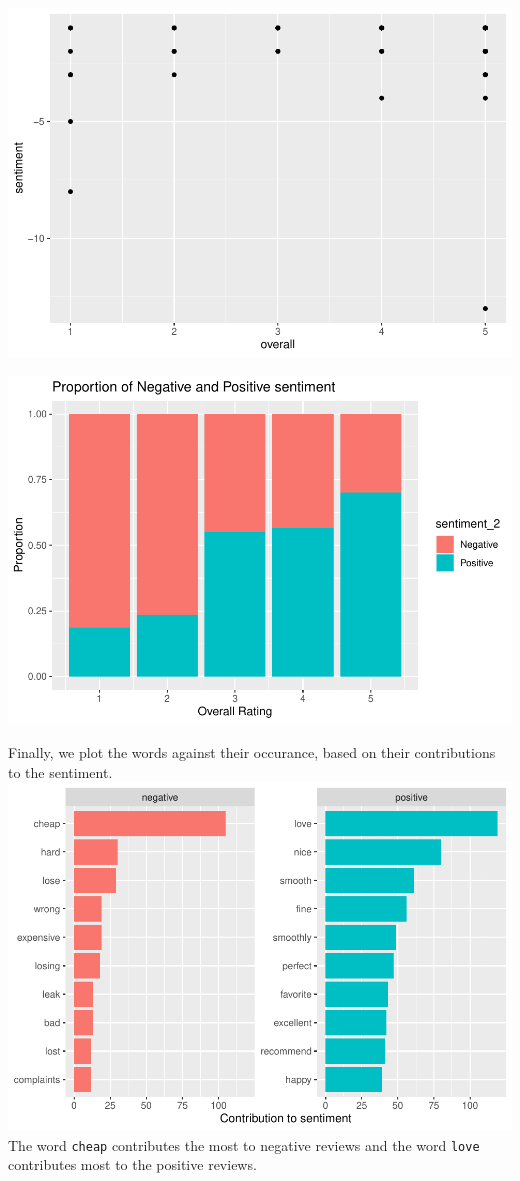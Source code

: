 \documentclass[
  11pt,
]{article}
\begin{document}
\includegraphics{Assignment-STAT702_files/figure-latex/top100_negative-1.pdf}

\includegraphics{Assignment-STAT702_files/figure-latex/proportion-1.pdf}

Finally, we plot the words against their occurance, based on their
contributions to the sentiment.
\includegraphics{Assignment-STAT702_files/figure-latex/plot_by_sentiment-1.pdf}
The word \texttt{cheap} contributes the most to negative reviews and the
word \texttt{love} contributes most to the positive reviews.
\end{document}
